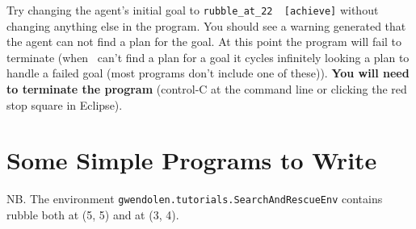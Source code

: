 Try changing the agent's initial goal to \lstinline{rubble_at_22  [achieve]} without changing anything else in the program.  You
should see a warning generated that the agent can not find a plan for
the goal.  At this point the program will
fail to
terminate (when \gwendolen\ can't find a
plan for a goal it cycles infinitely looking a plan to handle a failed
goal (most programs don't include one of these)).  {\bf You will need
  to terminate the program} (control-C at the command line or clicking
the red stop square in
Eclipse). 

\section{Some Simple Programs to Write}
\label{ex:tutorial3}
NB.  The environment
\texttt{gwendolen.tutorials.SearchAndRescueEnv} contains rubble both at (5, 5) and at (3, 4). 
